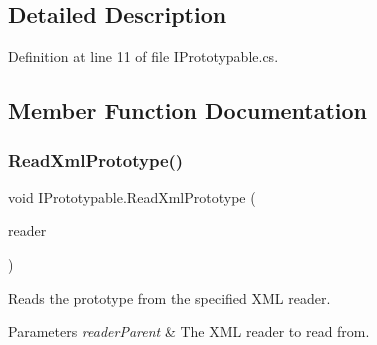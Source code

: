 \subsection{Detailed Description}


Definition at line 11 of file I\+Prototypable.\+cs.



\subsection{Member Function Documentation}
\mbox{\label{interface_i_prototypable_a024d752c4be655a7166db5718f1fad6a}} 
\subsubsection{\texorpdfstring{Read\+Xml\+Prototype()}{ReadXmlPrototype()}}
{\footnotesize\ttfamily void I\+Prototypable.\+Read\+Xml\+Prototype (\begin{DoxyParamCaption}\item[{Xml\+Reader}]{reader }\end{DoxyParamCaption})}



Reads the prototype from the specified X\+ML reader. 


\begin{DoxyParams}{Parameters}
{\em reader\+Parent} & The X\+ML reader to read from.\\
\hline
\end{DoxyParams}



